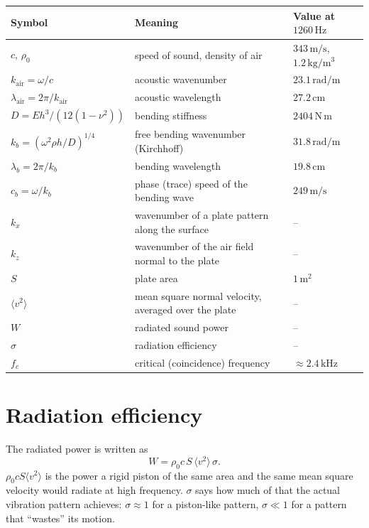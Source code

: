 \begin{center}
\begin{tabular}{|l|p{}|l|}
\hline
Symbol & Meaning & Value at $1260\,\mathrm{Hz}$ \\
\hline
$c$, $\rho_0$ & speed of sound, density of air & $343\,\mathrm{m/s}$, $1.2\,\mathrm{kg/m^3}$ \\
$k_\mathrm{air} = \omega/c$ & acoustic wavenumber & $23.1\,\mathrm{rad/m}$ \\
$\lambda_\mathrm{air} = 2\pi/k_\mathrm{air}$ & acoustic wavelength & $27.2\,\mathrm{cm}$ \\
$D = E h^3/(12(1-\nu^2))$ & bending stiffness & $2404\,\mathrm{N\,m}$ \\
$k_b = (\omega^2 \rho h/D)^{1/4}$ & free bending wavenumber (Kirchhoff) & $31.8\,\mathrm{rad/m}$ \\
$\lambda_b = 2\pi/k_b$ & bending wavelength & $19.8\,\mathrm{cm}$ \\
$c_b = \omega/k_b$ & phase (trace) speed of the bending wave & $249\,\mathrm{m/s}$ \\
$k_x$ & wavenumber of a plate pattern along the surface & -- \\
$k_z$ & wavenumber of the air field normal to the plate & -- \\
$S$ & plate area & $1\,\mathrm{m^2}$ \\
$\langle v^2 \rangle$ & mean square normal velocity, averaged over the plate & -- \\
$W$ & radiated sound power & -- \\
$\sigma$ & radiation efficiency & -- \\
$f_c$ & critical (coincidence) frequency & $\approx 2.4\,\mathrm{kHz}$ \\
\hline
\end{tabular}
\end{center}

\section{Radiation efficiency}

The radiated power is written as
\begin{equation}
  W = \rho_0 c\, S\, \langle v^2 \rangle\, \sigma .
  \label{eq:radiation_efficiency}
\end{equation}
$\rho_0 c S \langle v^2 \rangle$ is the power a rigid piston of the same area and
the same mean square velocity would radiate at high frequency. $\sigma$ says how
much of that the actual vibration pattern achieves: $\sigma \approx 1$ for a
piston-like pattern, $\sigma \ll 1$ for a pattern that ``wastes'' its motion.

